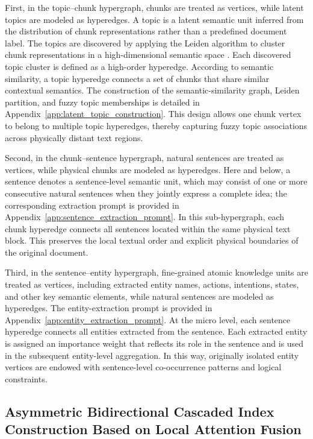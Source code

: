 \documentclass[a4paper,fleqn]{cas-dc}
\begin{document}
First, in the topic--chunk hypergraph, chunks are treated as vertices, while latent topics are modeled as hyperedges. A topic is a latent semantic unit inferred from the distribution of chunk representations rather than a predefined document label. The topics are discovered by applying the Leiden algorithm to cluster chunk representations in a high-dimensional semantic space \citep{Traag2019Leiden}. Each discovered topic cluster is defined as a high-order hyperedge. According to semantic similarity, a topic hyperedge connects a set of chunks that share similar contextual semantics. The construction of the semantic-similarity graph, Leiden partition, and fuzzy topic memberships is detailed in Appendix~\ref{app:latent_topic_construction}. This design allows one chunk vertex to belong to multiple topic hyperedges, thereby capturing fuzzy topic associations across physically distant text regions.

Second, in the chunk--sentence hypergraph, natural sentences are treated as vertices, while physical chunks are modeled as hyperedges. Here and below, a sentence denotes a sentence-level semantic unit, which may consist of one or more consecutive natural sentences when they jointly express a complete idea; the corresponding extraction prompt is provided in Appendix~\ref{app:sentence_extraction_prompt}. In this sub-hypergraph, each chunk hyperedge connects all sentences located within the same physical text block. This preserves the local textual order and explicit physical boundaries of the original document.

Third, in the sentence--entity hypergraph, fine-grained atomic knowledge units are treated as vertices, including extracted entity names, actions, intentions, states, and other key semantic elements, while natural sentences are modeled as hyperedges. The entity-extraction prompt is provided in Appendix~\ref{app:entity_extraction_prompt}. At the micro level, each sentence hyperedge connects all entities extracted from the sentence. Each extracted entity is assigned an importance weight that reflects its role in the sentence and is used in the subsequent entity-level aggregation. In this way, originally isolated entity vertices are endowed with sentence-level co-occurrence patterns and logical constraints.

\subsection{Asymmetric Bidirectional Cascaded Index Construction Based on Local Attention Fusion}
\end{document}

